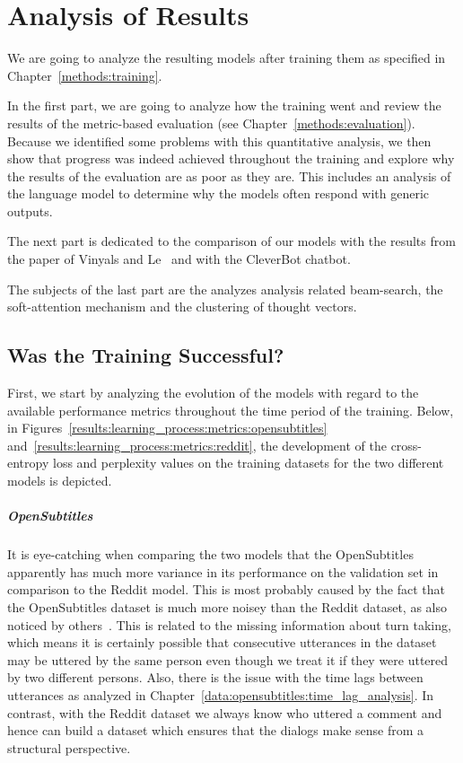 \chapter{Analysis of Results}
We are going to analyze the resulting models after training them as specified in Chapter~\ref{methods:training}.

In the first part, we are going to analyze how the training went and review the results of the metric-based evaluation (see Chapter~\ref{methods:evaluation}). Because we identified some problems with this quantitative analysis, we then show that progress was indeed achieved throughout the training and explore why the results of the evaluation are as poor as they are. This includes an analysis of the language model to determine why the models often respond with generic outputs.

The next part is dedicated to the comparison of our models with the results from the paper of Vinyals and Le~\cite{Vinyals:2015} and with the CleverBot chatbot.

The subjects of the last part are the analyzes analysis related beam-search, the soft-attention mechanism and the clustering of thought vectors.

\section{Was the Training Successful?}
First, we start by analyzing the evolution of the models with regard to the available performance metrics throughout the time period of the training. Below, in Figures~\ref{results:learning_process:metrics:opensubtitles} and~\ref{results:learning_process:metrics:reddit}, the development of the cross-entropy loss and perplexity values on the training datasets for the two different models is depicted.

\paragraph{OpenSubtitles} It is eye-catching when comparing the two models that the OpenSubtitles apparently has much more variance in its performance on the validation set in comparison to the Reddit model. This is most probably caused by the fact that the OpenSubtitles dataset is much more noisey than the Reddit dataset, as also noticed by others~\cite{Vinyals:2015}. This is related to the missing information about turn taking, which means it is certainly possible that consecutive utterances in the dataset may be uttered by the same person even though we treat it if they were uttered by two different persons. Also, there is the issue with the time lags between utterances as analyzed in Chapter~\ref{data:opensubtitles:time_lag_analysis}. In contrast, with the Reddit dataset we always know who uttered a comment and hence can build a dataset which ensures that the dialogs make sense from a structural perspective.

